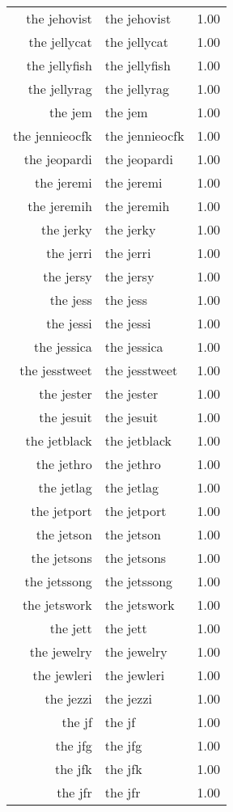 \begin{table}[ht]
\begin{tabular}{rlr}
  the jehovist & the jehovist & 1.00 \\ 
  the jellycat & the jellycat & 1.00 \\ 
  the jellyfish & the jellyfish & 1.00 \\ 
  the jellyrag & the jellyrag & 1.00 \\ 
  the jem & the jem & 1.00 \\ 
  the jennieocfk & the jennieocfk & 1.00 \\ 
  the jeopardi & the jeopardi & 1.00 \\ 
  the jeremi & the jeremi & 1.00 \\ 
  the jeremih & the jeremih & 1.00 \\ 
  the jerky & the jerky & 1.00 \\ 
  the jerri & the jerri & 1.00 \\ 
  the jersy & the jersy & 1.00 \\ 
  the jess & the jess & 1.00 \\ 
  the jessi & the jessi & 1.00 \\ 
  the jessica & the jessica & 1.00 \\ 
  the jesstweet & the jesstweet & 1.00 \\ 
  the jester & the jester & 1.00 \\ 
  the jesuit & the jesuit & 1.00 \\ 
  the jetblack & the jetblack & 1.00 \\ 
  the jethro & the jethro & 1.00 \\ 
  the jetlag & the jetlag & 1.00 \\ 
  the jetport & the jetport & 1.00 \\ 
  the jetson & the jetson & 1.00 \\ 
  the jetsons & the jetsons & 1.00 \\ 
  the jetssong & the jetssong & 1.00 \\ 
  the jetswork & the jetswork & 1.00 \\ 
  the jett & the jett & 1.00 \\ 
  the jewelry & the jewelry & 1.00 \\ 
  the jewleri & the jewleri & 1.00 \\ 
  the jezzi & the jezzi & 1.00 \\ 
  the jf & the jf & 1.00 \\ 
  the jfg & the jfg & 1.00 \\ 
  the jfk & the jfk & 1.00 \\ 
  the jfr & the jfr & 1.00 \\ 

\end{tabular}
\end{table}
